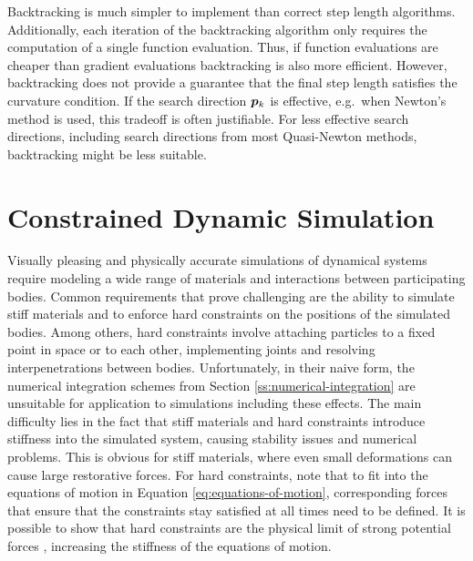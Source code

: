 Backtracking is much simpler to implement than correct step length algorithms. Additionally, each iteration of the backtracking algorithm
only requires the computation of a single function evaluation. Thus, if function evaluations are cheaper than gradient evaluations 
backtracking is also more efficient. However, backtracking does not provide a guarantee that the final step length satisfies the curvature
condition. If the search direction $\bm{p}_k$ is effective, e.g.\ when Newton's method is used, this tradeoff is often justifiable. 
For less effective search directions, including search directions from most Quasi-Newton methods, backtracking might be less suitable.

\section{Constrained Dynamic Simulation}\label{s:dynamic-simulation}
Visually pleasing and physically accurate simulations of dynamical systems require modeling a wide range of materials and 
interactions between participating bodies. Common requirements that prove challenging are the ability to simulate stiff materials
and to enforce hard constraints on the positions of the simulated bodies. Among others, hard constraints involve attaching particles
to a fixed point in space or to each other, implementing joints and resolving interpenetrations between bodies. Unfortunately, in their 
naive form, the numerical integration schemes from Section \ref{ss:numerical-integration} are unsuitable for application to simulations 
including these effects. The main difficulty lies in the fact that stiff materials and hard constraints introduce stiffness into 
the simulated system, causing stability issues and numerical problems. This is obvious for stiff materials, where even small 
deformations can cause large restorative forces. For hard constraints, note that to fit into the equations of motion in 
Equation \ref{eq:equations-of-motion}, corresponding forces that ensure that the constraints stay satisfied at all times need to be defined. 
It is possible to show that hard constraints are the physical limit of strong potential forces \cite{servin2006}, increasing the 
stiffness of the equations of motion. 

